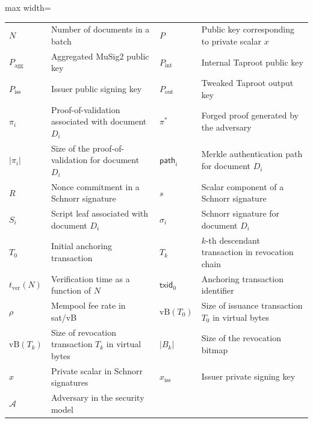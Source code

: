 \begin{table}[htbp]
\begin{adjustbox}{max width=\linewidth}
\begin{tabular}{
>{\raggedright\arraybackslash}m{2.8cm}
>{\raggedright\arraybackslash}m{5.2cm}
>{\raggedright\arraybackslash}m{2.8cm}
>{\raggedright\arraybackslash}m{5.2cm}
}
$N$ & Number of documents in a batch
& $P$ & Public key corresponding to private scalar $x$ \\

$P_{\mathrm{agg}}$ & Aggregated MuSig2 public key
& $P_{\mathrm{int}}$ & Internal Taproot public key \\

$P_{\mathrm{iss}}$ & Issuer public signing key
& $P_{\mathrm{out}}$ & Tweaked Taproot output key \\

$\pi_i$ & Proof-of-validation associated with document $D_i$
& $\pi^*$ & Forged proof generated by the adversary \\

$|\pi_i|$ & Size of the proof-of-validation for document $D_i$
& $\mathsf{path}_i$ & Merkle authentication path for document $D_i$ \\

$R$ & Nonce commitment in a Schnorr signature
& $s$ & Scalar component of a Schnorr signature \\

$S_i$ & Script leaf associated with document $D_i$
& $\sigma_i$ & Schnorr signature for document $D_i$ \\

$T_0$ & Initial anchoring transaction
& $T_k$ & $k$-th descendant transaction in revocation chain \\

$t_{\mathrm{ver}}(N)$ & Verification time as a function of $N$
& $\mathsf{txid}_0$ & Anchoring transaction identifier \\

$\rho$ & Mempool fee rate in sat/vB
& $\mathrm{vB}(T_0)$ & Size of issuance transaction $T_0$ in virtual bytes \\

$\mathrm{vB}(T_k)$ & Size of revocation transaction $T_k$ in virtual bytes
& $|B_k|$ & Size of the revocation bitmap \\

$x$ & Private scalar in Schnorr signatures
& $x_{\mathrm{iss}}$ & Issuer private signing key \\

$\mathcal{A}$ & Adversary in the security model
& & \\

\bottomrule
\end{tabular}
\end{adjustbox}

\end{table}